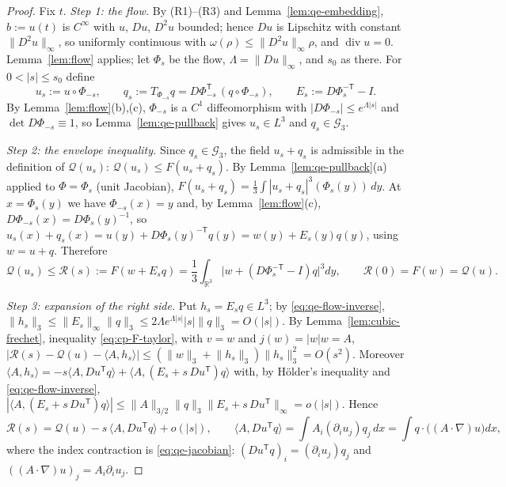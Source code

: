 \documentclass[11pt]{article}
\theoremstyle{definition}
\theoremstyle{plain}
\newcommand{\R}{\mathbb R}
\newcommand{\norm}[1]{\lVert #1\rVert}
\begin{document}
\begin{proof}
Fix $t$.  \emph{Step 1: the flow.}  By (R1)--(R3) and
Lemma~\ref{lem:qe-embedding}, $b:=u(t)$ is $C^\infty$ with $u$, $Du$,
$D^2u$ bounded; hence $Du$ is Lipschitz with constant
$\norm{D^2u}_\infty$, so uniformly continuous with
$\omega(\rho)\le\norm{D^2u}_\infty\rho$, and $\operatorname{div}u=0$.
Lemma~\ref{lem:flow} applies; let $\Phi_s$ be the flow, $\Lambda=\norm{Du}_\infty$,
and $s_0$ as there.  For $0<|s|\le s_0$ define
\[
 u_s:=u\circ\Phi_{-s},
 \qquad
 q_s:=T_{\Phi_{-s}}q=D\Phi_{-s}^{\mathsf T}\,(q\circ\Phi_{-s}),
 \qquad
 E_s:=D\Phi_s^{-\mathsf T}-I .
\]
By Lemma~\ref{lem:flow}(b),(c), $\Phi_{-s}$ is a $C^1$ diffeomorphism with
$|D\Phi_{-s}|\le e^{\Lambda|s|}$ and $\det D\Phi_{-s}\equiv1$, so
Lemma~\ref{lem:qe-pullback} gives $u_s\in L^3$ and $q_s\in\mathcal G_3$.

\emph{Step 2: the envelope inequality.}  Since $q_s\in\mathcal G_3$, the
field $u_s+q_s$ is admissible in the definition of $\mathcal Q(u_s)$:
$\mathcal Q(u_s)\le F(u_s+q_s)$.  By Lemma~\ref{lem:qe-pullback}(a) applied
to $\Phi=\Phi_s$ (unit Jacobian),
$F(u_s+q_s)=\frac13\int|u_s+q_s|^3(\Phi_s(y))\,dy$.  At $x=\Phi_s(y)$ we
have $\Phi_{-s}(x)=y$ and, by Lemma~\ref{lem:flow}(c),
$D\Phi_{-s}(x)=D\Phi_s(y)^{-1}$, so
$u_s(x)+q_s(x)=u(y)+D\Phi_s(y)^{-\mathsf T}q(y)=w(y)+E_s(y)q(y)$, using
$w=u+q$.  Therefore
\begin{equation}\label{eq:qe-envelope}
 \mathcal Q(u_s)\le\mathcal R(s):=F(w+E_sq)
 =\frac13\int_{\R^3}\bigl|w+(D\Phi_s^{-\mathsf T}-I)q\bigr|^3dy,
 \qquad\mathcal R(0)=F(w)=\mathcal Q(u).
\end{equation}

\emph{Step 3: expansion of the right side.}  Put $h_s=E_sq\in L^3$; by
\eqref{eq:qe-flow-inverse},
$\norm{h_s}_3\le\norm{E_s}_\infty\norm q_3\le2\Lambda e^{\Lambda|s|}|s|\norm q_3=O(|s|)$.
By Lemma~\ref{lem:cubic-frechet}, inequality \eqref{eq:cp-F-taylor}, with
$v=w$ and $j(w)=|w|w=A$,
$|\mathcal R(s)-\mathcal Q(u)-\langle A,h_s\rangle|\le(\norm w_3+\norm{h_s}_3)\norm{h_s}_3^2=O(s^2)$.
Moreover
$\langle A,h_s\rangle=-s\langle A,Du^{\mathsf T}q\rangle+\langle A,(E_s+s\,Du^{\mathsf T})q\rangle$
with, by H\"older's inequality and \eqref{eq:qe-flow-inverse},
$|\langle A,(E_s+s\,Du^{\mathsf T})q\rangle|
\le\norm A_{3/2}\norm q_3\norm{E_s+s\,Du^{\mathsf T}}_\infty=o(|s|)$.
Hence
\begin{equation}\label{eq:qe-right-expansion}
 \mathcal R(s)=\mathcal Q(u)-s\,\langle A,Du^{\mathsf T}q\rangle+o(|s|),
 \qquad
 \langle A,Du^{\mathsf T}q\rangle=\int A_i(\partial_iu_j)q_j\,dx
 =\int q\cdot\bigl((A\cdot\nabla)u\bigr)dx ,
\end{equation}
where the index contraction is \eqref{eq:qe-jacobian}:
$(Du^{\mathsf T}q)_i=(\partial_iu_j)q_j$ and $((A\cdot\nabla)u)_j=A_i\partial_iu_j$.


\end{proof}
\end{document}

